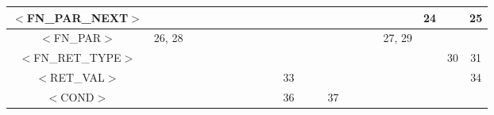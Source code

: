 \documentclass[a4paper,11pt]{article}
\begin{document}
\begin{table}[htbp]
\begin{tabular}{|c|c|c|c|c|c|c|c|c|c|c|c|c|c|c|c|c|c|c|c|c|}
\hline
$<$FN\_PAR\_NEXT$>$ &                             &                        &                        &                         &                           &                             &                              &                             &                             &                          &                           &                         &                          &                          &                            &                         &                             & \multicolumn{1}{c|}{24} &                           & 25                     \\ 
\hline
$<$FN\_PAR$>$       & \multicolumn{1}{c|}{26, 28} &                        &                        &                         &                           &                             &                              &                             &                             &                          &                           &                         &                          &                          &                            &                         & \multicolumn{1}{c|}{27, 29} &                         &                           & \multicolumn{1}{l|}{}  \\ 
\hline
$<$FN\_RET\_TYPE$>$ &                             &                        &                        &                         &                           &                             &                              &                             &                             &                          &                           &                         &                          &                          &                            &                         &                             &                         & \multicolumn{1}{c|}{30}   & 31                     \\ 
\hline
$<$RET\_VAL$>$      &                             &                        &                        &                         &                           &                             &                              &                             &                             & \multicolumn{1}{c|}{33}  &                           &                         &                          &                          &                            &                         &                             &                         &                           & 34                     \\ 
\hline
$<$COND$>$          &                             &                        &                        &                         &                           &                             &                              &                             &                             & \multicolumn{1}{c|}{36}  &                           &                         & \multicolumn{1}{c|}{37}  &                          &                            &                         &                             &                         &                           & \multicolumn{1}{l|}{}  \\ 

\end{tabular}
\end{table}
\end{document}
